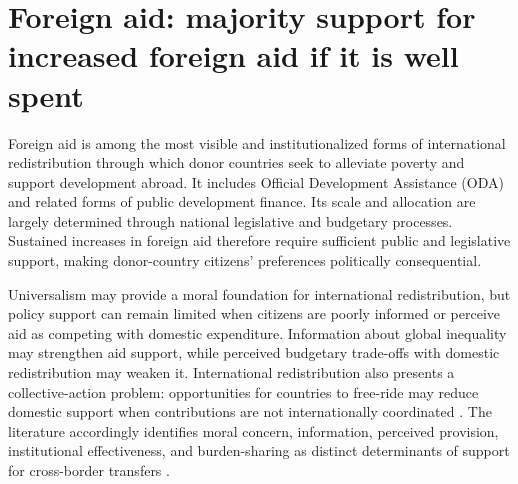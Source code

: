 \section{Foreign aid: majority support for increased foreign aid if it is well spent}

Foreign aid is among the most visible and institutionalized forms of international redistribution through which donor countries seek to alleviate poverty and support development abroad. It includes Official Development Assistance (ODA) and related forms of public development finance. Its scale and allocation are largely determined through national legislative and budgetary processes. Sustained increases in foreign aid therefore require sufficient public and legislative support, making donor-country citizens' preferences politically consequential.


Universalism may provide a moral foundation for international redistribution, but policy support can remain limited when citizens are poorly informed or perceive aid as competing with domestic expenditure. %
Information about global inequality may strengthen aid support, while perceived budgetary trade-offs with domestic redistribution may weaken it. International redistribution also presents a collective-action problem: opportunities for countries to free-ride may reduce domestic support when contributions are not internationally coordinated \citep{olson_1965}. %
The literature accordingly identifies moral concern, information, perceived provision, institutional effectiveness, and burden-sharing as distinct determinants of support for cross-border transfers \citep{cappelen_needs_2013,nair_misperceptions_2018,kaufmann_foreign_2019,gampfer_obtaining_2014}. %

